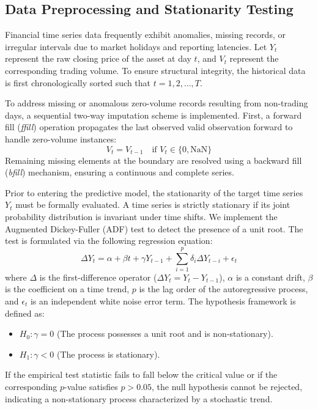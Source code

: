 \documentclass[11pt,twoside]{article}
\begin{document}
\subsection{Data Preprocessing and Stationarity Testing}
\label{SubSec:Preprocessing}

Financial time series data frequently exhibit anomalies, missing records, or irregular intervals due to market holidays and reporting latencies. Let $Y_t$ represent the raw closing price of the asset at day $t$, and $V_t$ represent the corresponding trading volume. To ensure structural integrity, the historical data is first chronologically sorted such that $t = 1, 2, \dots, T$.

To address missing or anomalous zero-volume records resulting from non-trading days, a sequential two-way imputation scheme is implemented. First, a forward fill (\textit{ffill}) operation propagates the last observed valid observation forward to handle zero-volume instances:
\begin{equation}
V_t = V_{t-1} \quad \text{if } V_t \in \{0, \text{NaN}\}
\end{equation}
Remaining missing elements at the boundary are resolved using a backward fill (\textit{bfill}) mechanism, ensuring a continuous and complete series.

Prior to entering the predictive model, the stationarity of the target time series $Y_t$ must be formally evaluated. A time series is strictly stationary if its joint probability distribution is invariant under time shifts. We implement the Augmented Dickey-Fuller (ADF) test \cite{Dickey1979} to detect the presence of a unit root. The test is formulated via the following regression equation:
\begin{equation}
\Delta Y_t = \alpha + \beta t + \gamma Y_{t-1} + \sum_{i=1}^{p} \delta_i \Delta Y_{t-i} + \epsilon_t
\end{equation}
where $\Delta$ is the first-difference operator ($\Delta Y_t = Y_t - Y_{t-1}$), $\alpha$ is a constant drift, $\beta$ is the coefficient on a time trend, $p$ is the lag order of the autoregressive process, and $\epsilon_t$ is an independent white noise error term. The hypothesis framework is defined as:
\begin{itemize}
    \item $H_0: \gamma = 0$ (The process possesses a unit root and is non-stationary).
    \item $H_1: \gamma < 0$ (The process is stationary).
\end{itemize}
If the empirical test statistic fails to fall below the critical value or if the corresponding $p$-value satisfies $p > 0.05$, the null hypothesis cannot be rejected, indicating a non-stationary process characterized by a stochastic trend.
\end{document}
